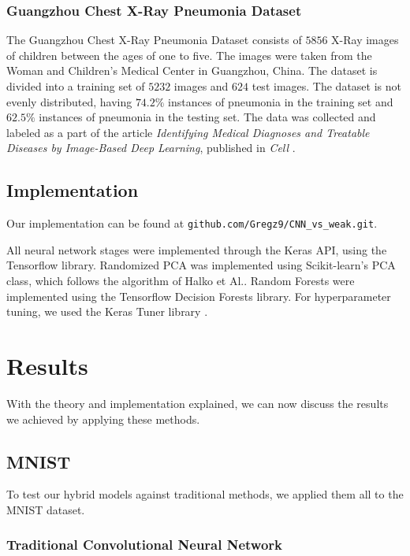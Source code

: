 \documentclass[onecolumn,10pt,cleanfoot]{asme2ej}
\begin{document}
\subsubsection{Guangzhou Chest X-Ray Pneumonia Dataset}

The Guangzhou Chest X-Ray Pneumonia Dataset consists of $5856$ X-Ray images of children between the ages of one to five. The images were taken from the Woman and Children's Medical Center in Guangzhou, China. The dataset is divided into a training set of $5232$ images and $624$ test images. The dataset is not evenly distributed, having $74.2\%$ instances of pneumonia in the training set and $62.5\%$ instances of pneumonia in the testing set. The data was collected and labeled as a part of the article {\it Identifying Medical Diagnoses and Treatable Diseases by Image-Based Deep Learning}, published in {\it Cell} \cite{xray}.

\subsection{Implementation}

Our implementation can be found at \texttt{github.com/Gregz9/CNN\_vs\_weak.git}.

All neural network stages were implemented through the Keras API, using the Tensorflow library. Randomized PCA was implemented using Scikit-learn's PCA class, which follows the algorithm of Halko et Al.. Random Forests were implemented using the Tensorflow Decision Forests library. For hyperparameter tuning, we used the Keras Tuner library \cite{kerastuner}.

\section{Results}

With the theory and implementation explained, we can now discuss the results we achieved by applying these methods.

\subsection{MNIST}

To test our hybrid models against traditional methods, we applied them all to the MNIST dataset.

\subsubsection{Traditional Convolutional Neural Network}
\end{document}
